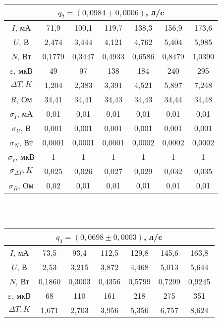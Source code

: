 \documentclass[a4paper,12pt]{article}
\begin{document}
\begin{enumerate}
\begin{center}
			\begin{tabular}{|c|c|c|c|c|c|c|}
				\hline
				\multicolumn{7}{|c|}{$q_2 = (0,0984 \pm 0,0006)$, л/c} \\ \hline
				$I$, мА 			& 71,9 		& 100,1		& 119,7		& 138,3  & 156,9	& 173,6  \\ \hline
				$U$, В 				& 2,474		& 3,444		& 4,121		& 4,762  & 5,404	& 5,985  \\ \hline
				$N$, Вт 			& 0,1779	& 0,3447	& 0,4933	& 0,6586 & 0,8479	& 1,0390 \\ \hline
				$\varepsilon$, мкВ 	& 49 		& 97		& 138 		& 184 	 & 240		& 295 	 \\ \hline
				$\Delta T, K$ 		& 1,204		& 2,383		& 3,391		& 4,521  & 5,897	& 7,248  \\ \hline
				$R$, Ом 			& 34,41 	& 34,41		& 34,43		& 34,43  & 34,44	& 34,48	 \\ \hline
				$\sigma_I$, мА 				& 0,01 	 & 0,01   	& 0,01 		& 0,01	 & 0,01		& 0,01	\\ \hline
				$\sigma_U$, В 				& 0,001  & 0,001  	& 0,001 	& 0,001  & 0,001 	& 0,001 \\ \hline
				$\sigma_N$, Вт 				& 0,0001 & 0,0001 	& 0,0001 	& 0,0002 & 0,0002 	& 0,0002 \\ \hline
				$\sigma_\varepsilon$, мкВ 	& 1 	 & 1 	  	& 1 		& 1 	 & 1 		& 1		\\ \hline
				$\sigma_{\Delta T}, K$ 		& 0,025  & 0,026	& 0,027 	& 0,029	 & 0,032	& 0,035 \\ \hline
				$\sigma_R$, Ом 				& 0,02 	 & 0,01 	& 0,01 		& 0,01	 & 0,01 	& 0,01 \\ \hline
			\end{tabular}
		      \\ \phantom{Русичи} \\
			\begin{tabular}{|c|c|c|c|c|c|c|}
				\hline
				\multicolumn{7}{|c|}{$q_3 = (0,0698 \pm 0,0003)$, л/c} \\ \hline
				$I$, мА 			& 73,5 		& 93,4		& 112,5		& 129,8  & 145,6	& 163,8 \\ \hline
				$U$, В 				& 2,53		& 3,215		& 3,872		& 4,468  & 5,013	& 5,644  \\ \hline
				$N$, Вт 			& 0,1860	& 0,3003	& 0,4356	& 0,5799 & 0,7299	& 0,9245 \\ \hline
				$\varepsilon$, мкВ 	& 68 		& 110		& 161 		& 218 	 & 275		& 351 	 \\ \hline
				$\Delta T, K$ 		& 1,671		& 2,703		& 3,956		& 5,356  & 6,757	& 8,624  \\ \hline

\end{tabular}
\end{center}
\end{enumerate}
\end{document}
